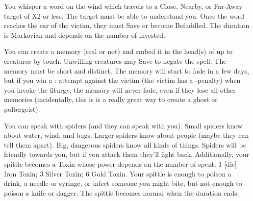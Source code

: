 {\LITURGY [
  Name= Iktomi's Suggestion,
  Link= iktomi-liturgy-iktomis-suggestion,
  Paradigm= Mind ,
  Save=  Y (negates) ,
  Duration= Markovian ,
  Counter=  n/a  ,
  Keywords= None ,
  Target=   Close; Nearby; or Far-Away creature
]



You whisper a word on the wind which travels to a Close, Nearby, or Far-Away target of \DICE X2 \HD or less. The target must be able to understand you.  Once the word reaches the ear of the victim, they must Save or become Befuddled.  The duration is Markovian and depends on the number of \DICE invested.
\LITURGY [
  Name= Memory Lane,
  Link=iktomi-liturgy-memory-lane,
  Paradigm= Mind ,
  Save=  Y (negates) ,
  Duration= Varies ,
  Counter=  n/a  ,
  Keywords= Splittable ,
  Target=   Close creature(s)
]



You can create a memory (real or not) and embed it in the head(s) of up to \DICE creatures by touch.  Unwilling creatures may Save to negate the spell.  The memory must be short and distinct.  The memory will start to fade in a few days, but if you win a \RB : \FOC attempt against the victim (the victim has a -\DICE penalty) when you invoke the liturgy, the memory will never fade, even if they lose all other memories (incidentally, this is is a really great way to create a ghost or poltergeist).

\LITURGY [
  Name= Spidertongue,
  Link=iktomi-liturgy-spidertongue,
  Paradigm= Biomancy ,
  Save=  Y (negates) ,
  Duration= Combat or \SUMDICE Minutes ,
  Counter=  n/a  ,
  Keywords= None ,
  Target=   Self
]



You can speak with spiders (and they can speak with you).  Small spiders know about water, wind, and bugs.  Larger spiders know about people (maybe they can tell them apart).  Big, dangerous spiders know all kinds of things.  Spiders will be friendly towards you, but if you attack them they'll fight back.  Additionally, your spittle becomes a Toxin whose power depends on the number of \DICE spent: 1 [die] Iron Toxin; 3 \DICE Silver Toxin; 6 \DICE Gold Toxin.  Your spittle is enough to poison a drink, a needle or syringe, or infect someone you might bite, but not enough to poison a knife or dagger.  The spittle becomes normal when the duration ends.





\GOD[
Name=Mímir,
Link=small-god-mímir,
GodOf=God of Runes,
Holy=a necklace of runes scribed on tiles
]

}
